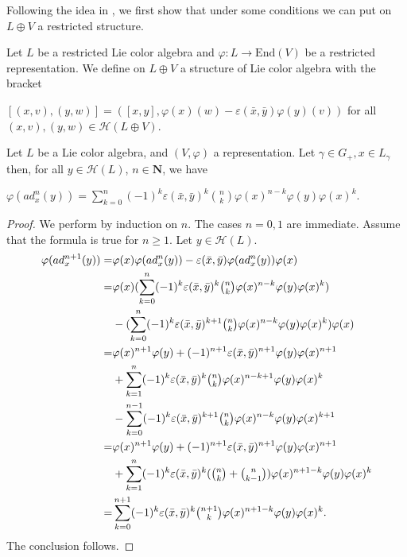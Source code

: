 \documentclass[11pt, twoside]{article}
\begin{document}
Following the idea in \cite{E23}, we first show that under some conditions we can put on $L\oplus V $ a restricted structure. 

Let $L$ be a restricted Lie color algebra and $\varphi:L\to \mathrm{End}(V)$ be a restricted representation. We define on $L\oplus V $ a structure of Lie color algebra with the bracket \begin{center}
    $[(x,v),(y,w)]= ([x,y],\varphi(x)(w) - \varepsilon(\bar{x},\bar{y})\varphi(y)(v)) $ for all $(x,v),(y,w)\in \mathcal{H}(L\oplus V) $.
\end{center}

\begin{lem}
    Let $L$ be a Lie color algebra, and $(V,\varphi) $ a representation. Let $\gamma\in G_+, x\in L_\gamma$ then, for all  $y\in \mathcal{H}(L) $, $n\in \mathbf{N}$, we have \begin{center}
        $\varphi(ad_x^{n}(y))= \sum\limits_{k=0}^n(-1)^k\varepsilon(\bar{x},\bar{y})^k\binom{n}{k}\varphi(x)^{n-k}\varphi(y)\varphi(x)^k $.
    \end{center}
\end{lem}

\begin{proof}
   We perform by induction on $n$. The cases $n=0,1$ are immediate. Assume that the formula is true for $n\geq 1$. Let $y\in \mathcal{H}(L)$. \begin{align*}
        \varphi(ad_x^{n+1}(y)) =& \varphi(x)\varphi(ad_x^n(y))- \varepsilon(\bar{x},\bar{y})\varphi(ad_x^n(y))\varphi(x) \\ =& \varphi(x)(\sum\limits_{k=0}^n(-1)^k\varepsilon(\bar{x},\bar{y})^k\tbinom{n}{k}\varphi(x)^{n-k}\varphi(y)\varphi(x)^k ) \\  & - (\sum\limits_{k=0}^n(-1)^k\varepsilon(\bar{x},\bar{y})^{k+1}\tbinom{n}{k}\varphi(x)^{n-k}\varphi(y)\varphi(x)^k )\varphi(x) \\  =& \varphi(x)^{n+1}\varphi(y) + (-1)^{n+1}\varepsilon(\bar{x},\bar{y})^{n+1} \varphi(y)\varphi(x)^{n+1} \\ &+ \sum\limits_{k=1}^n(-1)^k\varepsilon(\bar{x},\bar{y})^k\tbinom{n}{k}\varphi(x)^{n-k+1}\varphi(y)\varphi(x)^k \\ & - \sum\limits_{k=0}^{n-1}(-1)^k\varepsilon(\bar{x},\bar{y})^{k+1}\tbinom{n}{k}\varphi(x)^{n-k}\varphi(y)\varphi(x)^{k+1} \\ = & \varphi(x)^{n+1}\varphi(y) + (-1)^{n+1}\varepsilon(\bar{x},\bar{y})^{n+1}\varphi(y)\varphi(x)^{n+1} \\ &+ \sum\limits_{k=1}^n(-1)^k\varepsilon(\bar{x},\bar{y})^k(\tbinom{n}{k}+\tbinom{n}{k-1})\varphi(x)^{n+1-k}\varphi(y)\varphi(x)^k \\ = & \sum\limits_{k=0}^{n+1}(-1)^k\varepsilon(\bar{x},\bar{y})^k\tbinom{n+1}{k}\varphi(x)^{n+1-k}\varphi(y)\varphi(x)^k .
    \end{align*} The conclusion follows.
\end{proof}
\end{document}
